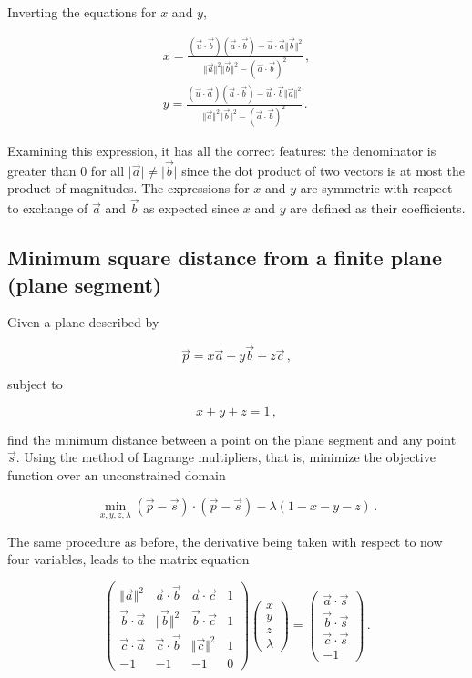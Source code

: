 \documentclass{article}
\begin{document}
Inverting the equations for $x$ and $y$,

\begin{align*}
    x=\frac{(\vec{u}\cdot\vec{b})(\vec{a}\cdot\vec{b}) - \vec{u}\cdot\vec{a} \Vert\vec{b}\Vert^2}{\Vert\vec{a}\Vert^2\Vert\vec{b}\Vert^2- (\vec{a}\cdot\vec{b})^2}\,,\\
    y=\frac{(\vec{u}\cdot\vec{a})(\vec{a}\cdot\vec{b}) - \vec{u}\cdot\vec{b} \Vert\vec{a}\Vert^2}{\Vert\vec{a}\Vert^2\Vert\vec{b}\Vert^2 - (\vec{a}\cdot\vec{b})^2 } \,.
\end{align*}

Examining this expression, it has all the correct features: the denominator is greater than $0$ for all $\vert \vec{a}\vert \neq \vert\vec{b}\vert$ since the dot product of two vectors is at most the product of magnitudes. The expressions for $x$ and $y$ are symmetric with respect to exchange of $\vec{a}$ and $\vec{b}$ as expected since $x$ and $y$ are defined as their coefficients.

\subsection{Minimum square distance from a finite plane (plane segment)}

Given a plane described by

$$ \vec{p} = x\vec{a} + y\vec{b} + z\vec{c} \,, $$

subject to

$$ x+y+z= 1 \,,$$

find the minimum distance between a point on the plane segment and any point $\vec{s}$. Using the method of Lagrange multipliers, that is, minimize the objective function over an unconstrained domain

$$ \min_{x,y,z,\lambda} (\vec{p}-\vec{s})\cdot(\vec{p}-\vec{s}) - \lambda (1-x-y-z) \,. $$

The same procedure as before, the derivative being taken with respect to now four variables, leads to the matrix equation

$$\begin{pmatrix}
    \Vert \vec{a}\Vert^2 & \vec{a}\cdot\vec{b} & \vec{a}\cdot\vec{c}& 1 \\ 
    \vec{b}\cdot\vec{a} & \Vert\vec{b}\Vert^2 & \vec{b}\cdot\vec{c}&1 \\
    \vec{c}\cdot\vec{a} & \vec{c}\cdot\vec{b} & \Vert\vec{c}\Vert^2 &1 \\
    -1 & -1 & -1 & 0
    \end{pmatrix} 
    \begin{pmatrix}x\\y\\z\\\lambda\end{pmatrix} 
        = \begin{pmatrix} \vec{a}\cdot\vec{s} \\ \vec{b}\cdot\vec{s} \\ \vec{c} \cdot\vec{s} \\ -1 \end{pmatrix} \,. $$
\end{document}
